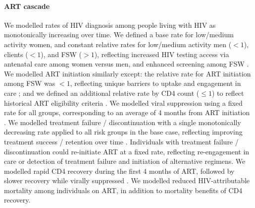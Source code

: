 \paragraph{ART cascade}
We modelled rates of HIV diagnosis among people living with HIV as monotonically increasing over time.
We defined a base rate for low/medium activity women,
and constant relative rates for low/medium activity men ($<1$), clients ($<1$), and FSW ($>1$),
reflecting increased HIV testing access via antenatal care among women versus men,
and enhanced screening among FSW \cite{Baral2014}.
We modelled ART initiation similarly except:
the relative rate for ART initiation among FSW was $<1$,
reflecting unique barriers to uptake and engagement in care \cite{Mountain2014sr}; and
we defined an additional relative rate by CD4 count ($\le1$)
to reflect historical ART eligibility criteria \cite{NERCHA2018rep}.
We modelled viral suppression using a fixed rate for all groups,
corresponding to an average of 4 months from ART initiation \cite{Mujugira2016}.
We modelled treatment failure / discontinuation with a single monotonically decreasing rate
applied to all risk groups in the base case,
reflecting improving treatment success / retention over time \cite{NERCHA2014nsf}.
Individuals with treatment failure / discontinuation could re-initiate ART at a fixed rate,
reflecting re-engagement in care or detection of treatment failure and initiation of alternative regimens.
We modelled rapid CD4 recovery during the first 4 months of ART,
followed by slower recovery while virally suppressed \cite{Battegay2006,Lawn2006,Gabillard2013}.
We modelled reduced HIV-attributable mortality among individuals on ART,
in addition to mortality benefits of CD4 recovery.
